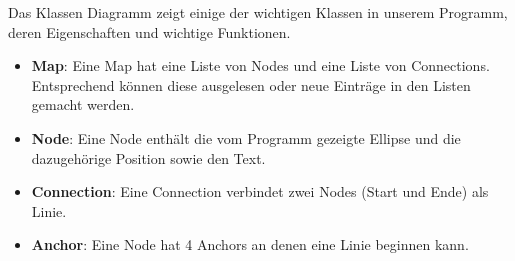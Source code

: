Das Klassen Diagramm zeigt einige der wichtigen Klassen in unserem Programm, deren Eigenschaften und wichtige Funktionen.
\begin{itemize}
\item \textbf{Map}: Eine Map hat eine Liste von Nodes und eine Liste von Connections. Entsprechend können diese ausgelesen oder neue Einträge in den Listen gemacht werden.
\item \textbf{Node}: Eine Node enthält die vom Programm gezeigte Ellipse und die dazugehörige Position sowie den Text.
\item \textbf{Connection}: Eine Connection verbindet zwei Nodes (Start und Ende) als Linie.
\item \textbf{Anchor}: Eine Node hat 4 Anchors an denen eine Linie beginnen kann.
\end{itemize}